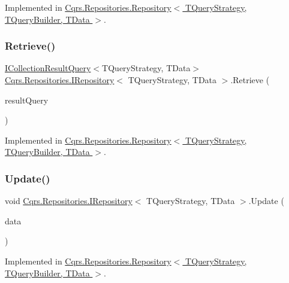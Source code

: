 Implemented in \hyperlink{classCqrs_1_1Repositories_1_1Repository_a4f83093a92d8141cdc2b908bbbd97f32_a4f83093a92d8141cdc2b908bbbd97f32}{Cqrs.\+Repositories.\+Repository$<$ T\+Query\+Strategy, T\+Query\+Builder, T\+Data $>$}.

\mbox{\label{interfaceCqrs_1_1Repositories_1_1IRepository_a0faeb50aa395d63ccd81e66906360e81_a0faeb50aa395d63ccd81e66906360e81}} 
\subsubsection{\texorpdfstring{Retrieve()}{Retrieve()}\hspace{0.1cm}{\footnotesize\ttfamily [2/2]}}
{\footnotesize\ttfamily \hyperlink{interfaceCqrs_1_1Repositories_1_1Queries_1_1ICollectionResultQuery}{I\+Collection\+Result\+Query}$<$T\+Query\+Strategy, T\+Data$>$ \hyperlink{interfaceCqrs_1_1Repositories_1_1IRepository}{Cqrs.\+Repositories.\+I\+Repository}$<$ T\+Query\+Strategy, T\+Data $>$.Retrieve (\begin{DoxyParamCaption}\item[{\hyperlink{interfaceCqrs_1_1Repositories_1_1Queries_1_1ICollectionResultQuery}{I\+Collection\+Result\+Query}$<$ T\+Query\+Strategy, T\+Data $>$}]{result\+Query }\end{DoxyParamCaption})}



Implemented in \hyperlink{classCqrs_1_1Repositories_1_1Repository_ab1136a454f981848d49e0d0a2f4b6a2f_ab1136a454f981848d49e0d0a2f4b6a2f}{Cqrs.\+Repositories.\+Repository$<$ T\+Query\+Strategy, T\+Query\+Builder, T\+Data $>$}.

\mbox{\label{interfaceCqrs_1_1Repositories_1_1IRepository_af8a0b1cf5eedd7653d2867ab38657d46_af8a0b1cf5eedd7653d2867ab38657d46}} 
\subsubsection{\texorpdfstring{Update()}{Update()}}
{\footnotesize\ttfamily void \hyperlink{interfaceCqrs_1_1Repositories_1_1IRepository}{Cqrs.\+Repositories.\+I\+Repository}$<$ T\+Query\+Strategy, T\+Data $>$.Update (\begin{DoxyParamCaption}\item[{T\+Data}]{data }\end{DoxyParamCaption})}



Implemented in \hyperlink{classCqrs_1_1Repositories_1_1Repository_a893276506e64034992d2c29d5ef11100_a893276506e64034992d2c29d5ef11100}{Cqrs.\+Repositories.\+Repository$<$ T\+Query\+Strategy, T\+Query\+Builder, T\+Data $>$}.


